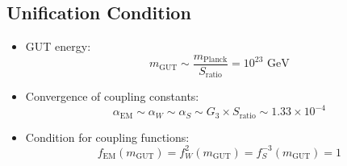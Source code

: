 \documentclass[12pt,a4paper]{article}
\begin{document}
	\subsection{Unification Condition}
	\begin{itemize}
		\item GUT energy:
		\begin{equation}
			m_{\text{GUT}} \sim \frac{m_{\text{Planck}}}{S_{\text{ratio}}} = 10^{23} \text{ GeV}
		\end{equation}
		
		\item Convergence of coupling constants:
		\begin{equation}
			\alpha_{\text{EM}} \sim \alpha_W \sim \alpha_S \sim G_3 \times S_{\text{ratio}} \sim 1.33 \times 10^{-4}
		\end{equation}
		
		\item Condition for coupling functions:
		\begin{equation}
			f_{\text{EM}}(m_{\text{GUT}}) = f_W^2(m_{\text{GUT}}) = f_S^{-3}(m_{\text{GUT}}) = 1
		\end{equation}
	\end{itemize}
\end{document}
